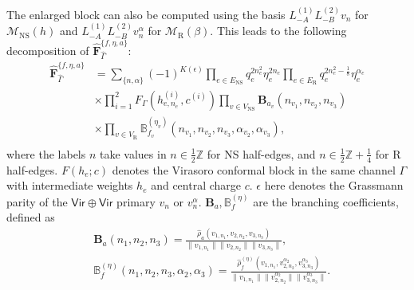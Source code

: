 \documentclass[aps,10pt,twocolumn,superscriptaddress]{revtex4-2}
\def\ie{\begin{equation}\begin{aligned}}
\def\fe{\end{aligned}\end{equation}}
\def\NS{\mathrm{NS}}
\def\R{\mathrm{R}}
\begin{document}
The enlarged block can also be computed using the basis $L_{-A}^{(1)}L_{-B}^{(2)}v_n$ for $\mathcal{M}_{\NS}(h)$ and $L_{-A}^{(1)}L_{-B}^{(2)}v_n^\alpha$ for $\mathcal{M}_{\R}(\beta)$. This leads to the following decomposition of $\widehat{\mathbf{F}}_{\hat{\Gamma}}^{\{f, \eta, a\}}$:
\ie
\widehat{\mathbf{F}}_{\hat{\Gamma}}^{\{f, \eta, a\}} &= \sum_{\{n,\alpha\}} (-1)^{K(\epsilon)} \prod_{e\in E_\NS} q_e^{2n_e^2}\eta_e^{2n_e} \prod_{e\in E_\R} q_e^{2n_e^2-\frac{1}{8}}\eta_e^{\alpha_e}\\
&\times \prod_{i=1}^2 F_{\Gamma}(h_{e,n_e}^{(i)}, c^{(i)}) \prod_{v\in V_\NS} \mathbf{B}_{a_v}(n_{v_1},n_{v_2},n_{v_3})\\
&\times \prod_{v\in V_\R} \mathbb{B}_{f_v}^{(\eta_v)}(n_{v_1},n_{v_2},n_{v_3},\alpha_{v_2},\alpha_{v_3}),\\
\fe
where the labels $n$ take values in $n\in \frac{1}{2}\mathbb{Z}$ for NS half-edges, and $n\in \frac{1}{2}\mathbb{Z}+\frac{1}{4}$ for R half-edges. $F(h_e; c)$ denotes the Virasoro conformal block in the same channel $\Gamma$ with intermediate weights $h_{e}$ and central charge $c$. $\epsilon$ here denotes the Grassmann parity of the $\mathsf{Vir}\oplus \mathsf{Vir}$ primary $v_n$ or $v_n^\alpha$. $\mathbf{B}_a, \mathbb{B}^{(\eta)}_f$ are the branching coefficients, defined as
\ie \label{branch}
&\mathbf{B}_a(n_1, n_2, n_3) = \frac{\hat{\rho}_a(v_{1,n_1}, v_{2,n_2}, v_{3,n_3})}{\|v_{1,n_1}\|\|v_{2,n_2}\|\|v_{3,n_3}\|},\\
&\mathbb{B}^{(\eta)}_f(n_1, n_2, n_3,\alpha_2, \alpha_3) = \frac{\hat{\rho}_f^{(\eta)}(v_{1,n_1}, v_{2,n_2}^{\alpha_2}, v_{3,n_3}^{\alpha_3})}{\|v_{1,n_1}\|\|v_{2,n_2}^{\alpha_2}\|\|v_{3,n_3}^{\alpha_3}\|}.
\fe
\end{document}
